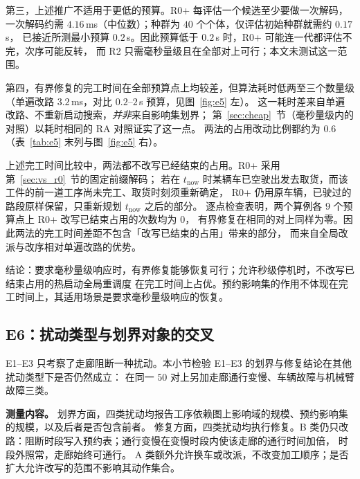 \documentclass[manuscript,screen,review]{acmart}
\newcommand{\NPairs}{50}
\newcommand{\MsRepairMed}{3.2}
\newcommand{\RzeroPastLo}{0}
\newcommand{\MsRedecode}{4.16}       %
\begin{document}
第三，上述推广不适用于更低的预算。R0+ 每评估一个候选至少要做一次解码，一次解码约需
\(\MsRedecode\)\,ms（中位数）；种群为 \(40\) 个个体，仅评估初始种群就需约 \(0.17\)\,s，
已接近所测最小预算 \(0.2\)\,s。因此预算低于 \(0.2\)\,s 时，R0+ 可能连一代都评估不完，次序可能反转，
而 R2 只需毫秒量级且在全部对上可行；本文未测试这一范围。

第四，有界修复的完工时间在全部预算点上均较差，但算法耗时低两至三个数量级
（单遍改路 \(\MsRepairMed\)\,ms，对比 \(0.2\)--\(2\)\,s 预算，见图~\ref{fig:e5} 左）。
这一耗时差来自单遍改路、不重新启动搜索，\emph{并非}来自影响集划界；
第~\ref{sec:cheap}~节（毫秒量级内的对照）以耗时相同的 RA 对照证实了这一点。
两法的占用改动比例都约为 \(0.6\)（表~\ref{tab:e5} 末列与图~\ref{fig:e5} 右）。

上述完工时间比较中，两法都不改写已经结束的占用。R0+ 采用第~\ref{sec:vs_r0}~节的固定前缀解码；
若在 \(t_{\mathrm{now}}\) 时某辆车已空驶出发去取货，而该工件的前一道工序尚未完工、取货时刻须重新确定，
R0+ 仍用原车辆，已驶过的路段原样保留，只重新规划 \(t_{\mathrm{now}}\) 之后的部分。
逐点检查表明，两个算例各 \(9\) 个预算点上 R0+ 改写已结束占用的次数均为 \(\RzeroPastLo\)，
有界修复在相同的对上同样为零。因此两法的完工时间差距不包含「改写已结束的占用」带来的部分，
而来自全局改派与改序相对单遍改路的优势。

结论：要求毫秒量级响应时，有界修复能够恢复可行；允许秒级停机时，不改写已结束占用的热启动全局重调度
在完工时间上占优。预约影响集的作用不体现在完工时间上，其适用场景是要求毫秒量级响应的恢复。

\subsection{E6：扰动类型与划界对象的交叉}
\label{sec:e6}

E1--E3 只考察了走廊阻断一种扰动。本小节检验 E1--E3 的划界与修复结论在其他扰动类型下是否仍然成立：
在同一 \(\NPairs\) 对上另加走廊通行变慢、车辆故障与机械臂故障三类。

\textbf{测量内容。} 划界方面，四类扰动均报告工序依赖图上影响域的规模、预约影响集的规模，以及后者是否包含前者。
修复方面，四类扰动均执行修复。B 类仍只改路：阻断时段写入预约表；通行变慢在变慢时段内使该走廊的通行时间加倍，
时段外照常，走廊始终可通行。
A 类额外允许换车或改派，不改变加工顺序；是否扩大允许改写的范围不影响其动作集合。
\end{document}
